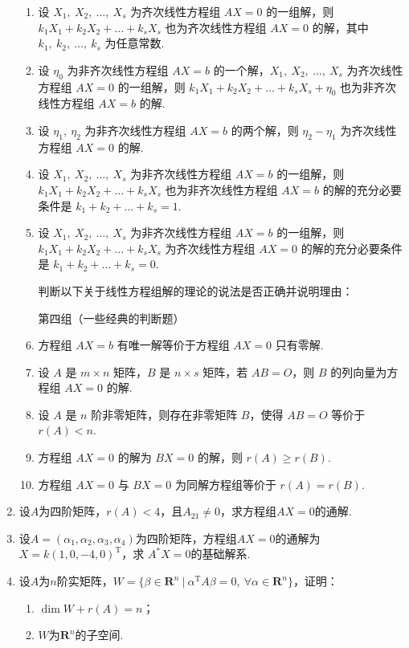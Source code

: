 \begin{enumerate}
\begin{enumerate}
        \item 设 $X_1,\ X_2,\ \dots,\ X_s$ 为齐次线性方程组 $AX=0$ 的一组解，则 $k_1X_1+k_2X_2+\dots+k_sX_s$ 也为齐次线性方程组 $AX=0$ 的解，其中 $k_1,\ k_2,\ \dots,\ k_s$ 为任意常数.
        
        \item 设 $\eta_0$ 为非齐次线性方程组 $AX=b$ 的一个解，$X_1,\ X_2,\ \dots,\ X_s$ 为齐次线性方程组 $AX=0$ 的一组解，则 $k_1X_1+k_2X_2+\dots+k_sX_s+\eta_0$ 也为非齐次线性方程组 $AX=b$ 的解.
        
        \item 设 $\eta_1,\ \eta_2$ 为非齐次线性方程组 $AX=b$ 的两个解，则 $\eta_2-\eta_1$ 为齐次线性方程组 $AX=0$ 的解.
        
        \item 设 $X_1,\ X_2,\ \dots,\ X_s$ 为非齐次线性方程组 $AX=b$ 的一组解，则 $k_1X_1+k_2X_2+\dots+k_sX_s$ 也为非齐次线性方程组 $AX=b$ 的解的充分必要条件是 $k_1+k_2+\dots+k_s=1$.
        
        \item 设 $X_1,\ X_2,\ \dots,\ X_s$ 为非齐次线性方程组 $AX=b$ 的一组解，则 $k_1X_1+k_2X_2+\dots+k_sX_s$ 为齐次线性方程组 $AX=0$ 的解的充分必要条件是 $k_1+k_2+\dots+k_s=0$.
        
    判断以下关于线性方程组解的理论的说法是否正确并说明理由：
        
    第四组（一些经典的判断题）
        
        \item 方程组 $AX=b$ 有唯一解等价于方程组 $AX=0$ 只有零解.
        
        \item 设 $A$ 是 $m \times n$ 矩阵，$B$ 是 $n \times s$ 矩阵，若 $AB=O$，则 $B$ 的列向量为方程组 $AX=0$ 的解.
        
        \item 设 $A$ 是 $n$ 阶非零矩阵，则存在非零矩阵 $B$，使得 $AB=O$ 等价于 $r(A)<n$.
        
        \item 方程组 $AX=0$ 的解为 $BX=0$ 的解，则 $r(A)\ge r(B)$.
        
        \item 方程组 $AX=0$ 与 $BX=0$ 为同解方程组等价于 $r(A)=r(B)$.
    \end{enumerate}
    
    \item 设$A$为四阶矩阵，$r(A)<4$，且$A_{21}\neq 0$，求方程组$AX=0$的通解.
    \item 设$A=(\alpha_1,\alpha_2,\alpha_3,\alpha_4)$为四阶矩阵，方程组$AX=0$的通解为$X=k(1,0,-4,0)^\mathrm{T}$，求
    $A^*X=0$的基础解系.
    \item 设$A$为$n$阶实矩阵，$W=\{\beta\in\mathbf{R}^n\ |\ \alpha^\mathrm{T}A\beta=0,\ \forall \alpha\in\mathbf{R}^n\}$，证明：
    \begin{enumerate}[label=(\arabic*)]
        \item $\dim W+r(A)=n$；
        \item $W$为$\mathbf{R}^n$的子空间.
    \end{enumerate}


\end{enumerate}
